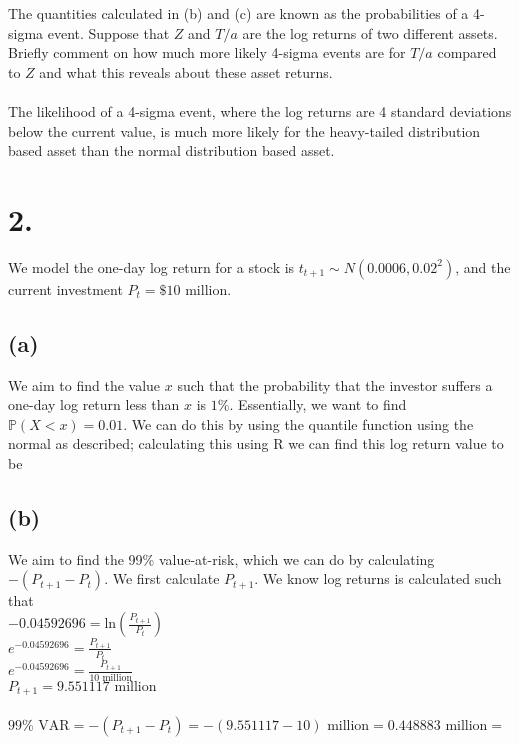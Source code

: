 \documentclass{article}
\begin{document}
{The quantities calculated in (b) and (c) are known as the probabilities of a 4-sigma event. Suppose that $Z$ and $T/a$ are the log returns of two different assets. Briefly comment on how much more likely 4-sigma events are for $T/a$ compared to $Z$ and what this reveals about these asset returns. \\ \\
The likelihood of a 4-sigma event, where the log returns are 4 standard deviations below the current value, is much more likely for the heavy-tailed distribution based asset than the normal distribution based asset.

}

\section*{2.}
{\Large

We model the one-day log return for a stock is $t_{t+1} \sim N(0.0006, 0.02^2)$, and the current investment $P_t = \$ 10$ million.

\subsection*{(a)}

We aim to find the value $x$ such that the probability that the investor suffers a one-day log return less than $x$ is $1\%$. Essentially, we want to find $\mathbb{P}(X < x) = 0.01$. We can do this by using the quantile function using the normal as described; calculating this using R we can find this log return value to be 


\subsection*{(b)}

We aim to find the 99\% value-at-risk, which we can do by calculating $-(P_{t+1} - P_t)$. We first calculate $P_{t+1}$. We know log returns is calculated such that \\
$-0.04592696 = \text{ln}(\frac{P_{t+1}}{P_t})$ \\
$e^{-0.04592696} = \frac{P_{t+1}}{P_t}$ \\ 
$e^{-0.04592696} = \frac{P_{t+1}}{10 \text{ million}}$ \\ 
$P_{t+1} = 9.551117 \text{ million}$ \\ \\
$99\% \text{ VAR} = -(P_{t+1} - P_t) = -(9.551117 - 10) \text{ million} = 0.448883 \text{ million} = $ 

}
\end{document}
